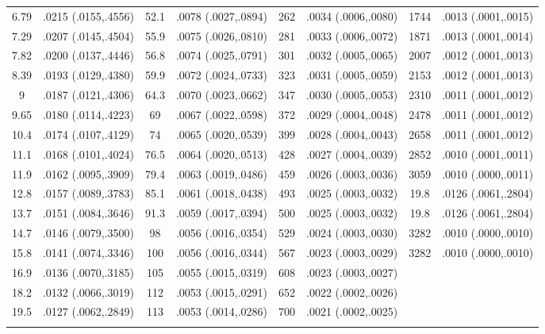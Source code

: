 \begin{longtable}{cccccccc}
  6.79 & .0215 (.0155,.4556) & 52.1 & .0078 (.0027,.0894) & 262 & .0034 (.0006,.0080) & 1744 & .0013 (.0001,.0015) \\ 
  7.29 & .0207 (.0145,.4504) & 55.9 & .0075 (.0026,.0810) & 281 & .0033 (.0006,.0072) & 1871 & .0013 (.0001,.0014) \\ 
  7.82 & .0200 (.0137,.4446) & 56.8 & .0074 (.0025,.0791) & 301 & .0032 (.0005,.0065) & 2007 & .0012 (.0001,.0013) \\ 
  8.39 & .0193 (.0129,.4380) & 59.9 & .0072 (.0024,.0733) & 323 & .0031 (.0005,.0059) & 2153 & .0012 (.0001,.0013) \\ 
  9 & .0187 (.0121,.4306) & 64.3 & .0070 (.0023,.0662) & 347 & .0030 (.0005,.0053) & 2310 & .0011 (.0001,.0012) \\ 
  9.65 & .0180 (.0114,.4223) & 69 & .0067 (.0022,.0598) & 372 & .0029 (.0004,.0048) & 2478 & .0011 (.0001,.0012) \\ 
  10.4 & .0174 (.0107,.4129) & 74 & .0065 (.0020,.0539) & 399 & .0028 (.0004,.0043) & 2658 & .0011 (.0001,.0012) \\ 
  11.1 & .0168 (.0101,.4024) & 76.5 & .0064 (.0020,.0513) & 428 & .0027 (.0004,.0039) & 2852 & .0010 (.0001,.0011) \\ 
  11.9 & .0162 (.0095,.3909) & 79.4 & .0063 (.0019,.0486) & 459 & .0026 (.0003,.0036) & 3059 & .0010 (.0000,.0011) \\ 
  12.8 & .0157 (.0089,.3783) & 85.1 & .0061 (.0018,.0438) & 493 & .0025 (.0003,.0032) & 19.8 & .0126 (.0061,.2804) \\ 
  13.7 & .0151 (.0084,.3646) & 91.3 & .0059 (.0017,.0394) & 500 & .0025 (.0003,.0032) & 19.8 & .0126 (.0061,.2804) \\ 
  14.7 & .0146 (.0079,.3500) & 98 & .0056 (.0016,.0354) & 529 & .0024 (.0003,.0030) & 3282 & .0010 (.0000,.0010) \\ 
  15.8 & .0141 (.0074,.3346) & 100 & .0056 (.0016,.0344) & 567 & .0023 (.0003,.0029) & 3282 & .0010 (.0000,.0010) \\ 
  16.9 & .0136 (.0070,.3185) & 105 & .0055 (.0015,.0319) & 608 & .0023 (.0003,.0027) &  &  \\ 
  18.2 & .0132 (.0066,.3019) & 112 & .0053 (.0015,.0291) & 652 & .0022 (.0002,.0026) &  &  \\ 
  19.5 & .0127 (.0062,.2849) & 113 & .0053 (.0014,.0286) & 700 & .0021 (.0002,.0025) &  &  \\ 
   \hline
\hline
\label{tab marginalized_risks_eq 1}
\end{longtable}
